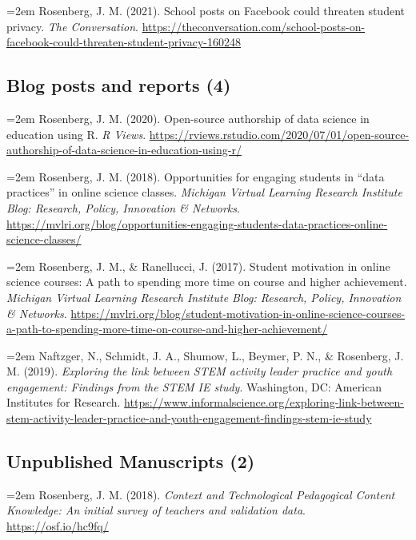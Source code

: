 \documentclass[
  14,
]{article}
\begin{document}
\hangindent=2em Rosenberg, J. M. (2021). School posts on Facebook could
threaten student privacy. \emph{The Conversation}.
\url{https://theconversation.com/school-posts-on-facebook-could-threaten-student-privacy-160248}

\hypertarget{blog-posts-and-reports-4}{%
\subsection{Blog posts and reports (4)}\label{blog-posts-and-reports-4}}

\hangindent=2em Rosenberg, J. M. (2020). Open-source authorship of data
science in education using R. \emph{R Views}.
\url{https://rviews.rstudio.com/2020/07/01/open-source-authorship-of-data-science-in-education-using-r/}

\hangindent=2em Rosenberg, J. M. (2018). Opportunities for engaging
students in ``data practices'' in online science classes. \emph{Michigan
Virtual Learning Research Institute Blog: Research, Policy, Innovation
\& Networks}.
\url{https://mvlri.org/blog/opportunities-engaging-students-data-practices-online-science-classes/}

\hangindent=2em Rosenberg, J. M., \& Ranellucci, J. (2017). Student
motivation in online science courses: A path to spending more time on
course and higher achievement. \emph{Michigan Virtual Learning Research
Institute Blog: Research, Policy, Innovation \& Networks}.
\url{https://mvlri.org/blog/student-motivation-in-online-science-courses-a-path-to-spending-more-time-on-course-and-higher-achievement/}

\hangindent=2em Naftzger, N., Schmidt, J. A., Shumow, L., Beymer, P. N.,
\& Rosenberg, J. M. (2019). \emph{Exploring the link between STEM
activity leader practice and youth engagement: Findings from the STEM IE
study}. Washington, DC: American Institutes for Research.
\url{https://www.informalscience.org/exploring-link-between-stem-activity-leader-practice-and-youth-engagement-findings-stem-ie-study}

\hypertarget{unpublished-manuscripts-2}{%
\subsection{Unpublished Manuscripts
(2)}\label{unpublished-manuscripts-2}}

\hangindent=2em Rosenberg, J. M. (2018). \emph{Context and Technological
Pedagogical Content Knowledge: An initial survey of teachers and
validation data}. \url{https://osf.io/hc9fq/}
\end{document}

